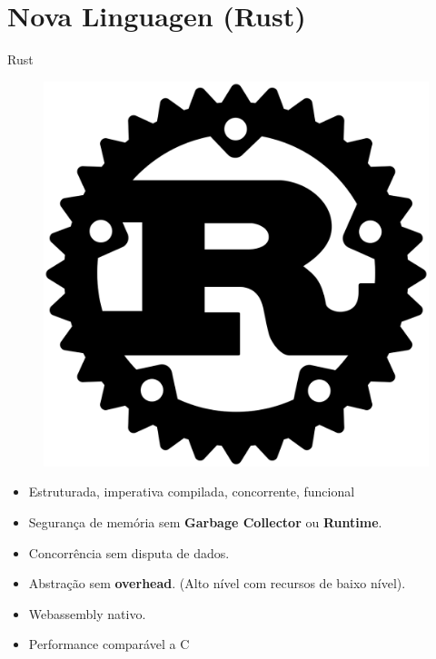 \section{Nova Linguagen (Rust)}

\begin{frame}[fragile]{Rust}
\begin{figure}[ht!]
  \centering
  \includegraphics[scale=0.1]{images/rust.png}
\end{figure}
\begin{center}
\begin{itemize}
    \item Estruturada, imperativa compilada, concorrente, funcional
    \item Segurança de memória sem \textbf{Garbage Collector} ou \textbf{Runtime}.
    \item Concorrência sem disputa de dados.
    \item Abstração sem \textbf{overhead}. (Alto nível com recursos de baixo nível).
    \item Webassembly nativo.
    \item Performance comparável a C
\end{itemize}
\end{center}
\end{frame}

